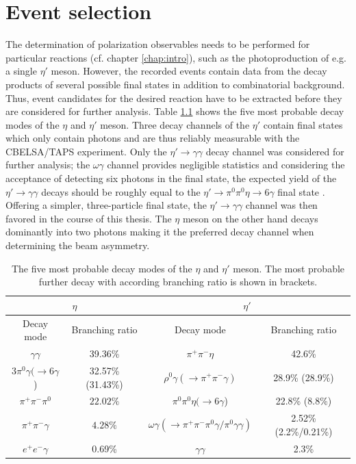 \chapter{Event selection}
\label{chap:events}
The determination of polarization observables needs to be performed for particular reactions (cf. chapter \ref{chap:intro}), such as the photoproduction of e.g. a single $\eta'$ meson. However, the recorded events  contain data from the decay products of several possible final states in addition to combinatorial background. Thus, event candidates for the desired reaction have to be extracted before they are considered for further analysis. Table \ref{tab:etap} shows the five most probable decay modes of the $\eta$ and $\eta'$ meson. Three decay channels of the $\eta'$ contain final states which only contain photons and are thus reliably measurable with the CBELSA/TAPS experiment. Only the $\eta'\to\gamma\gamma$ decay channel was considered for further analysis; the $\omega\gamma$ channel provides negligible statistics and considering the acceptance of detecting six photons in the final state, the expected yield of the $\eta'\to\gamma\gamma$ decays should be roughly equal to the $\eta'\to\pi^0\pi^0\eta\to6\gamma$ final state \cite{farahmsc}. Offering a simpler, three-particle final state, the $\eta'\to\gamma\gamma$ channel was then favored in the course of this thesis. The $\eta$ meson on the other hand decays dominantly into two photons making it the preferred decay channel when determining the beam asymmetry.
\begin{table}[htbp]
	\centering
	\begin{tabular}{cc|cc}
		\toprule
		\multicolumn{2}{c|}{$\eta$}&\multicolumn{2}{c}{$\eta'$}\\
		\hline
		Decay mode&Branching ratio&Decay mode&Branching ratio\\
		\hline
		$\gamma\gamma$&39.36\%&$\pi^+\pi^-\eta$&42.6\%\\
		$3\pi^0\gamma$$(\to6\gamma$) &32.57\% (31.43\%)&$\rho^0\gamma(\to\pi^+\pi^-\gamma)$ &28.9\% (28.9\%)\\
	$\pi^+\pi^-\pi^0$ & $22.02\%$ &$\pi^0\pi^0\eta(\to6\gamma$) & 22.8\% (8.8\%)\\
		$\pi^+\pi^-\gamma$&$4.28\%$&$\omega\gamma(\to \pi^+\pi^-\pi^0\gamma/\pi^0\gamma\gamma)$&2.52\% (2.2\%/0.21\%)\\
	$e^+e^-\gamma$&0.69\%&$\gamma\gamma$&2.3\%\\

		\bottomrule
	\end{tabular}
\caption{The five most probable decay modes of the $\eta$ and $\eta'$ meson. The most probable further decay with according branching ratio is shown in brackets.\cite{pdg}}
\label{tab:etap}
\end{table}

